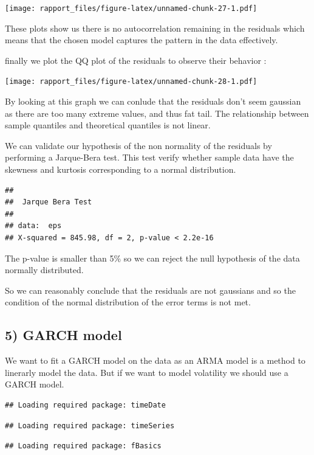 \documentclass[]{article}
\begin{document}
\texttt{[image: rapport\_files/figure-latex/unnamed-chunk-27-1.pdf]}

These plots show us there is no autocorrelation remaining in the
residuals which means that the chosen model captures the pattern in the
data effectively.

finally we plot the QQ plot of the residuals to observe their behavior :

\texttt{[image: rapport\_files/figure-latex/unnamed-chunk-28-1.pdf]}

By looking at this graph we can conlude that the residuals don't seem
gaussian as there are too many extreme values, and thus fat tail. The
relationship between sample quantiles and theoretical quantiles is not
linear.

We can validate our hypothesis of the non normality of the residuals by
performing a Jarque-Bera test. This test verify whether sample data have
the skewness and kurtosis corresponding to a normal distribution.

\begin{verbatim}
## 
##  Jarque Bera Test
## 
## data:  eps
## X-squared = 845.98, df = 2, p-value < 2.2e-16
\end{verbatim}

The p-value is smaller than 5\% so we can reject the null hypothesis of
the data normally distributed.

So we can reasonably conclude that the residuals are not gaussians and
so the condition of the normal distribution of the error terms is not
met.

\subsection{5) GARCH model}

We want to fit a GARCH model on the data as an ARMA model is a method to
linerarly model the data. But if we want to model volatility we should
use a GARCH model.

\begin{verbatim}
## Loading required package: timeDate
\end{verbatim}

\begin{verbatim}
## Loading required package: timeSeries
\end{verbatim}

\begin{verbatim}
## Loading required package: fBasics
\end{verbatim}
\end{document}
